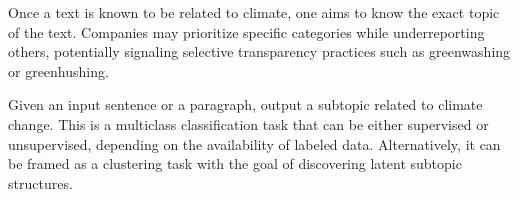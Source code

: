 Once a text is known to be related to climate, one aims to know the exact topic of the text.
Companies may prioritize specific categories while underreporting others, potentially signaling selective transparency practices such as greenwashing or greenhushing.

\task Given an input sentence or a paragraph, output a subtopic related to climate change. This is a multiclass classification task that can be either supervised or unsupervised, depending on the availability of labeled data. Alternatively, it can be framed as a clustering task with the goal of discovering latent subtopic structures.

